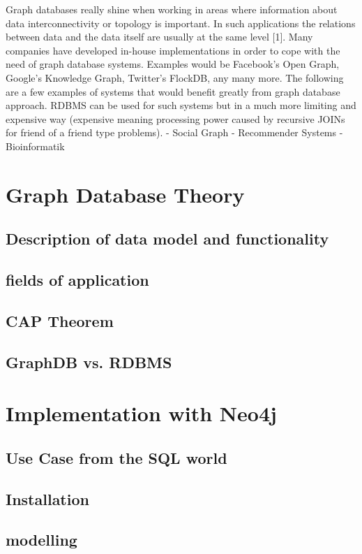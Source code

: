 Graph databases really shine when working in areas where information about data interconnectivity or topology is important.
In such applications the relations between data and the data itself are usually at the same level [1]. Many companies have
developed in-house implementations in order to cope with the need of graph database systems. Examples would be
Facebook’s Open Graph, Google’s Knowledge Graph, Twitter’s FlockDB, any many more. The following are a few
examples of systems that would benefit greatly from graph database approach. RDBMS can be used for such systems but in a
much more limiting and expensive way (expensive meaning processing power caused by recursive JOINs for friend of a
friend type problems). 
- Social Graph
- Recommender Systems
- Bioinformatik

\section{Graph Database Theory}
\subsection{Description of data model and functionality}
\subsection{fields of application}
\subsection{CAP Theorem}
\subsection{GraphDB vs. RDBMS}

\section{Implementation with Neo4j}
\subsection{Use Case from the SQL world}
\subsection{Installation}
\subsection{modelling}
